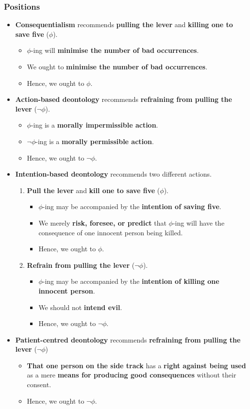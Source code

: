 \documentclass[11pt]{article}
\begin{document}
 \newpage
\subsubsection{Positions}
\label{sec:orgf001f37}
\begin{itemize}
\item \textbf{Consequentialism} recommends \textbf{pulling the lever} and \textbf{killing one to save five} (\(\phi\)).
\begin{itemize}
\item \(\phi\)-ing will \textbf{minimise the number of bad occurrences}.
\item We ought to \textbf{minimise the number of bad occurrences}.
\item Hence, we ought to \(\phi\).
\end{itemize}
\item \textbf{Action-based deontology} recommends \textbf{refraining from pulling the lever} (\(\neg \phi\)).
\begin{itemize}
\item \(\phi\)-ing is a \textbf{morally impermissible action}.
\item \(\neg \phi\)-ing is a \textbf{morally permissible action}.
\item Hence, we ought to \(\neg \phi\).
\end{itemize}
\item \textbf{Intention-based deontology} recommends two different actions.
\begin{enumerate}
\item \textbf{Pull the lever} and \textbf{kill one to save five} (\(\phi\)).
\begin{itemize}
\item \(\phi\)-ing may be accompanied by the \textbf{intention of saving five}.
\item We merely \textbf{risk, foresee, or predict} that \(\phi\)-ing will have the consequence of one innocent person being killed.
\item Hence, we ought to \(\phi\).
\end{itemize}
\item \textbf{Refrain from pulling the lever} (\(\neg \phi\)).
\begin{itemize}
\item \(\phi\)-ing may be accompanied by the \textbf{intention of killing one innocent person}.
\item We should not \textbf{intend evil}.
\item Hence, we ought to \(\neg \phi\).
\end{itemize}
\end{enumerate}
\item \textbf{Patient-centred deontology} recommends \textbf{refraining from pulling the lever} (\(\neg \phi\))
\begin{itemize}
\item \textbf{That one person on the side track} has a \textbf{right against being used} as a mere \textbf{means for producing good consequences} without their consent.
\item Hence, we ought to \(\neg \phi\).
\end{itemize}
\end{itemize}
\end{document}
